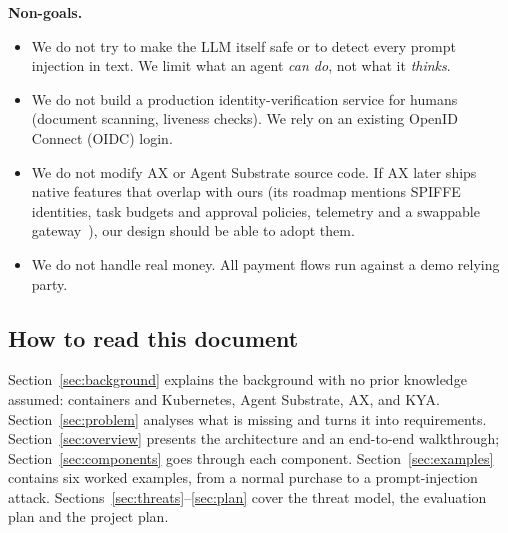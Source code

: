 \textbf{Non-goals.}
\begin{itemize}
  \item We do not try to make the LLM itself safe or to detect every prompt injection in text. We limit what an agent \emph{can do}, not what it \emph{thinks}.
  \item We do not build a production identity-verification service for humans (document scanning, liveness checks). We rely on an existing OpenID Connect (OIDC) login.
  \item We do not modify AX or Agent Substrate source code. If AX later ships native features that overlap with ours (its roadmap mentions SPIFFE identities, task budgets and approval policies, telemetry and a swappable gateway~\cite{ax-roadmap}), our design should be able to adopt them.
  \item We do not handle real money. All payment flows run against a demo relying party.
\end{itemize}

\subsection{How to read this document}

Section~\ref{sec:background} explains the background with no prior knowledge assumed: containers and Kubernetes, Agent Substrate, AX, and KYA. Section~\ref{sec:problem} analyses what is missing and turns it into requirements. Section~\ref{sec:overview} presents the architecture and an end-to-end walkthrough; Section~\ref{sec:components} goes through each component. Section~\ref{sec:examples} contains six worked examples, from a normal purchase to a prompt-injection attack. Sections~\ref{sec:threats}--\ref{sec:plan} cover the threat model, the evaluation plan and the project plan.
